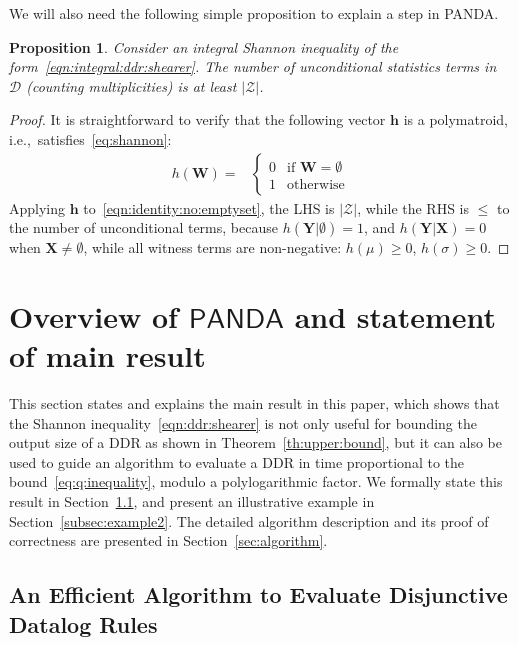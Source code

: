 \documentclass[10pt,a4paper]{article}
\newtheorem{proposition}{Proposition}[section]
\newcommand{\calD}{\mathcal D}
\newcommand{\calZ}{\mathcal Z}
\newcommand{\panda}{\textsf{PANDA}\xspace}
\begin{document}
We will also need the following simple proposition to explain a step in \panda.

\begin{proposition}
Consider an integral Shannon inequality of the form~\eqref{eqn:integral:ddr:shearer}.
The number of unconditional statistics terms in $\calD$ (counting multiplicities)
is at least $|\calZ|$.
\label{prop:whole:terms}
\end{proposition}
\begin{proof}
It is straightforward to verify that the following vector $\bm h$ is a polymatroid,
i.e.,~satisfies~\eqref{eq:shannon}:
\begin{align*}
  h(\bm W) = &
               \begin{cases}
                 0 & \mbox{if $\bm W = \emptyset$}\\
                 1 & \mbox{otherwise}
               \end{cases}
\end{align*}
Applying $\bm h$ to~\eqref{eqn:identity:no:emptyset}, the LHS is $|\calZ|$, while the RHS
is $\leq$ to the number of unconditional terms, because
$h(\bm Y | \emptyset) =1$, and
$h(\bm Y | \bm X) =0$ when $\bm X \neq \emptyset$, while all witness terms are non-negative:
$h(\mu)\geq 0$, $h(\sigma)\geq 0$.
\end{proof}


\section{Overview of $\panda$ and statement of main result}
\label{sec:main:results}
This section states and explains the main result in this paper, which shows that the
Shannon inequality~\eqref{eqn:ddr:shearer} is not only useful for bounding the output size
of a DDR as shown in Theorem~\ref{th:upper:bound}, but it can also be used to guide an algorithm
to evaluate a DDR in time proportional to the bound~\eqref{eq:q:inequality}, modulo a
polylogarithmic factor.
We formally state this result in Section~\ref{subsec:main:result}, and present an illustrative
example in Section~\ref{subsec:example2}.
The detailed algorithm description and its proof of correctness are presented in Section~\ref{sec:algorithm}.

\subsection{An Efficient Algorithm to Evaluate Disjunctive Datalog Rules}
\label{subsec:main:result}
\end{document}
